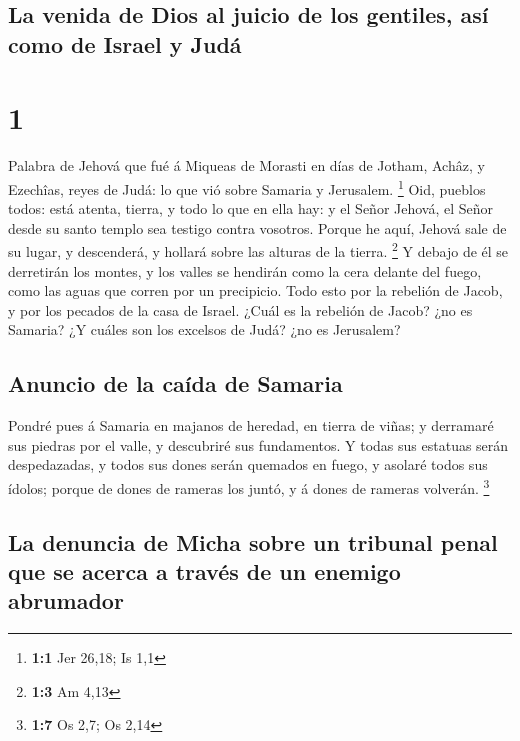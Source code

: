 \hypertarget{la-venida-de-dios-al-juicio-de-los-gentiles-asuxed-como-de-israel-y-juduxe1}{%
\subsection{La venida de Dios al juicio de los gentiles, así como de
Israel y
Judá}\label{la-venida-de-dios-al-juicio-de-los-gentiles-asuxed-como-de-israel-y-juduxe1}}

\hypertarget{section}{%
\section{1}\label{section}}

 Palabra de Jehová que fué á Miqueas de Morasti en días de
Jotham, Achâz, y Ezechîas, reyes de Judá: lo que vió sobre Samaria y
Jerusalem. \footnote{\textbf{1:1} Jer 26,18; Is 1,1}  Oid,
pueblos todos: está atenta, tierra, y todo lo que en ella hay: y el
Señor Jehová, el Señor desde su santo templo sea testigo contra
vosotros.  Porque he aquí, Jehová sale de su lugar, y
descenderá, y hollará sobre las alturas de la tierra. \footnote{\textbf{1:3}
  Am 4,13}  Y debajo de él se derretirán los montes, y los
valles se hendirán como la cera delante del fuego, como las aguas que
corren por un precipicio.  Todo esto por la rebelión de
Jacob, y por los pecados de la casa de Israel. ¿Cuál es la rebelión de
Jacob? ¿no es Samaria? ¿Y cuáles son los excelsos de Judá? ¿no es
Jerusalem?

\hypertarget{anuncio-de-la-cauxedda-de-samaria}{%
\subsection{Anuncio de la caída de
Samaria}\label{anuncio-de-la-cauxedda-de-samaria}}

 Pondré pues á Samaria en majanos de heredad, en tierra de
viñas; y derramaré sus piedras por el valle, y descubriré sus
fundamentos.  Y todas sus estatuas serán despedazadas, y
todos sus dones serán quemados en fuego, y asolaré todos sus ídolos;
porque de dones de rameras los juntó, y á dones de rameras volverán.
\footnote{\textbf{1:7} Os 2,7; Os 2,14}

\hypertarget{la-denuncia-de-micha-sobre-un-tribunal-penal-que-se-acerca-a-travuxe9s-de-un-enemigo-abrumador}{%
\subsection{La denuncia de Micha sobre un tribunal penal que se acerca a
través de un enemigo
abrumador}\label{la-denuncia-de-micha-sobre-un-tribunal-penal-que-se-acerca-a-travuxe9s-de-un-enemigo-abrumador}}

